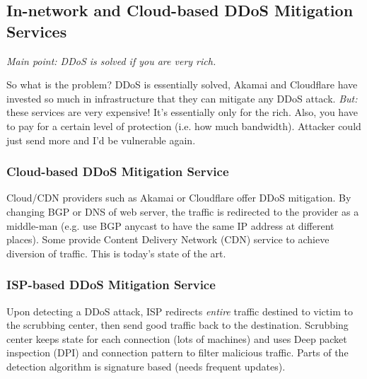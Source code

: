 \documentclass[11pt,oneside,a4paper]{article}
\begin{document}
\subsection{In-network and Cloud-based DDoS	Mitigation Services}

\textit{Main point: DDoS is solved if you are very rich.}

So what is the problem? DDoS is essentially solved, Akamai and Cloudflare have invested so much in infrastructure that they can mitigate any DDoS attack. \textit{But:} these services are very expensive! It's essentially only for the rich. Also, you have to pay for a certain level of protection (i.e. how much bandwidth). Attacker could just send more and I'd be vulnerable again.

\subsubsection{Cloud-based DDoS Mitigation Service}

Cloud/CDN providers such as Akamai or Cloudflare offer DDoS mitigation. By changing BGP or DNS of web server, the traffic is redirected to the provider as a middle-man (e.g. use BGP anycast to have the same IP address at different places). Some provide Content Delivery Network (CDN) service to achieve diversion of traffic. This is today's state of the art.

\subsubsection{ISP-based DDoS Mitigation Service}

Upon detecting a DDoS attack, ISP redirects \textit{entire} traffic destined to victim to the scrubbing center, then send good traffic back to the destination. Scrubbing center keeps state for each connection (lots of machines) and uses Deep packet inspection (DPI) and connection pattern to filter malicious traffic. Parts of the detection algorithm is signature based (needs frequent updates).
\end{document}
